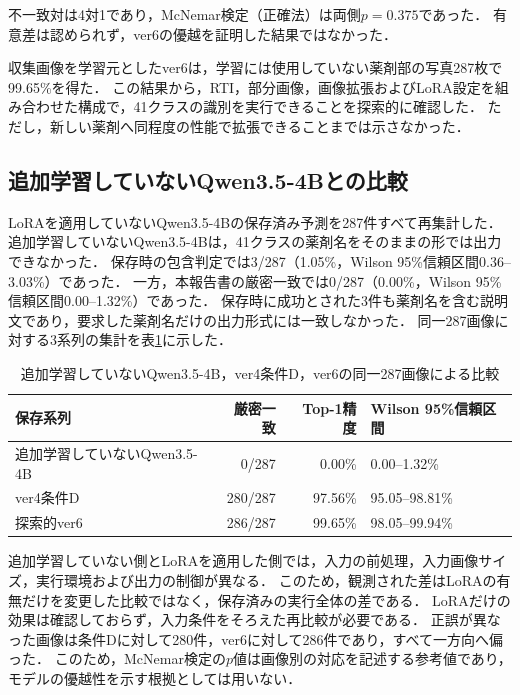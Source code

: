 \documentclass[uplatex,dvipdfmx]{jsarticle}
\begin{document}
不一致対は4対1であり，McNemar検定（正確法）は両側$p=0.375$であった．
有意差は認められず，ver6の優越を証明した結果ではなかった．

収集画像を学習元としたver6は，学習には使用していない薬剤部の写真287枚で99.65\%を得た．
この結果から，RTI，部分画像，画像拡張およびLoRA設定を組み合わせた構成で，41クラスの識別を実行できることを探索的に確認した．
ただし，新しい薬剤へ同程度の性能で拡張できることまでは示さなかった．

\subsection{追加学習していないQwen3.5-4Bとの比較}\label{sec:qwen_baseline}

LoRAを適用していないQwen3.5-4Bの保存済み予測を287件すべて再集計した．
追加学習していないQwen3.5-4Bは，41クラスの薬剤名をそのままの形では出力できなかった．
保存時の包含判定では3/287（1.05\%，Wilson 95\%信頼区間0.36--3.03\%）であった．
一方，本報告書の厳密一致では0/287（0.00\%，Wilson 95\%信頼区間0.00--1.32\%）であった．
保存時に成功とされた3件も薬剤名を含む説明文であり，要求した薬剤名だけの出力形式には一致しなかった．
同一287画像に対する3系列の集計を表\ref{tab:qwen_baseline}に示した．

\begin{table}[H]
  \centering
  \caption{追加学習していないQwen3.5-4B，ver4条件D，ver6の同一287画像による比較}
  \label{tab:qwen_baseline}
  \small
  \begin{tabular}{|p{4.6cm}|r|r|p{3.1cm}|}
    \hline
    保存系列 & 厳密一致 & Top-1精度 & Wilson 95\%信頼区間 \\ \hline
    追加学習していないQwen3.5-4B & 0/287 & 0.00\% & 0.00--1.32\% \\ \hline
    ver4条件D & 280/287 & 97.56\% & 95.05--98.81\% \\ \hline
    探索的ver6 & 286/287 & 99.65\% & 98.05--99.94\% \\ \hline
  \end{tabular}
\end{table}

追加学習していない側とLoRAを適用した側では，入力の前処理，入力画像サイズ，実行環境および出力の制御が異なる．
このため，観測された差はLoRAの有無だけを変更した比較ではなく，保存済みの実行全体の差である．
LoRAだけの効果は確認しておらず，入力条件をそろえた再比較が必要である．
正誤が異なった画像は条件Dに対して280件，ver6に対して286件であり，すべて一方向へ偏った．
このため，McNemar検定の$p$値は画像別の対応を記述する参考値であり，モデルの優越性を示す根拠としては用いない．
\end{document}
